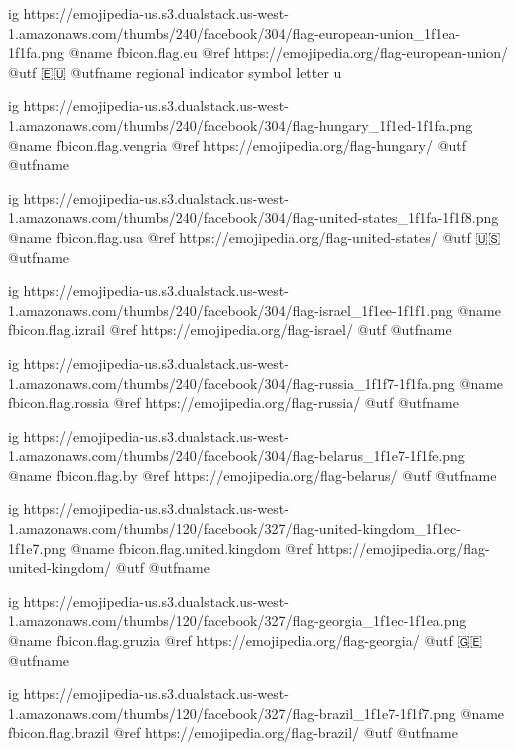  
 
 
 
 

\ifcmt

  ig https://emojipedia-us.s3.dualstack.us-west-1.amazonaws.com/thumbs/240/facebook/304/flag-european-union_1f1ea-1f1fa.png
  @name fbicon.flag.eu
  @ref https://emojipedia.org/flag-european-union/
  @utf 🇪🇺
  @utfname regional indicator symbol letter u

  ig https://emojipedia-us.s3.dualstack.us-west-1.amazonaws.com/thumbs/240/facebook/304/flag-hungary_1f1ed-1f1fa.png
  @name fbicon.flag.vengria
  @ref https://emojipedia.org/flag-hungary/
  @utf
  @utfname

  ig https://emojipedia-us.s3.dualstack.us-west-1.amazonaws.com/thumbs/240/facebook/304/flag-united-states_1f1fa-1f1f8.png
  @name fbicon.flag.usa
  @ref https://emojipedia.org/flag-united-states/
  @utf 🇺🇸
  @utfname

  ig https://emojipedia-us.s3.dualstack.us-west-1.amazonaws.com/thumbs/240/facebook/304/flag-israel_1f1ee-1f1f1.png
  @name fbicon.flag.izrail
  @ref https://emojipedia.org/flag-israel/
  @utf
  @utfname

  ig https://emojipedia-us.s3.dualstack.us-west-1.amazonaws.com/thumbs/240/facebook/304/flag-russia_1f1f7-1f1fa.png
  @name fbicon.flag.rossia
  @ref https://emojipedia.org/flag-russia/
  @utf 
  @utfname

  ig https://emojipedia-us.s3.dualstack.us-west-1.amazonaws.com/thumbs/240/facebook/304/flag-belarus_1f1e7-1f1fe.png
  @name fbicon.flag.by
  @ref https://emojipedia.org/flag-belarus/
  @utf
  @utfname

	ig https://emojipedia-us.s3.dualstack.us-west-1.amazonaws.com/thumbs/120/facebook/327/flag-united-kingdom_1f1ec-1f1e7.png
	@name fbicon.flag.united.kingdom
	@ref https://emojipedia.org/flag-united-kingdom/
	@utf
	@utfname

	ig https://emojipedia-us.s3.dualstack.us-west-1.amazonaws.com/thumbs/120/facebook/327/flag-georgia_1f1ec-1f1ea.png
	@name fbicon.flag.gruzia
	@ref https://emojipedia.org/flag-georgia/
	@utf 🇬🇪
	@utfname

	ig https://emojipedia-us.s3.dualstack.us-west-1.amazonaws.com/thumbs/120/facebook/327/flag-brazil_1f1e7-1f1f7.png
	@name fbicon.flag.brazil
	@ref https://emojipedia.org/flag-brazil/
	@utf
	@utfname


